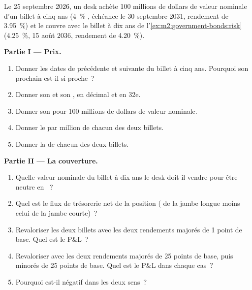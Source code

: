 \begin{problem}\label{pb:m2:government-bonds:1}
Le 25 septembre 2026, un desk achète 100 millions de dollars de valeur nominale d'un billet à cinq ans (4~\%
, échéance le 30 septembre 2031, rendement de 3.95~\%) et le couvre avec le billet à dix ans
de l'\cref{ex:m2:government-bonds:risk} (4.25~\%, 15 août 2036, rendement de
4.20~\%).

\medskip\noindent\textbf{Partie I --- Prix.}
\begin{enumerate}
\item Donner les dates de  précédente et suivante du billet à cinq ans. Pourquoi son
prochain  est-il si proche~?
\item Donner son  et son , en décimal et en 32e.
\item Donner son  pour 100 millions de dollars de valeur nominale.
\item Donner le  par million de chacun des deux billets.
\item Donner la  de chacun des deux billets.
\end{enumerate}

\medskip\noindent\textbf{Partie II --- La couverture.}
\begin{enumerate}[resume]
\item Quelle valeur nominale du billet à dix ans le desk doit-il vendre pour être neutre en ~?
\item Quel est le flux de trésorerie net de la position ( de la jambe longue moins
celui de la jambe courte)~?
\item Revaloriser les deux billets avec les deux rendements majorés de 1 point de base. Quel
est le P\&L~?
\item Revaloriser avec les deux rendements majorés de 25 points de base, puis minorés de 25 points de base. Quel
est le P\&L dans chaque cas~?
\item Pourquoi est-il négatif dans les deux sens~?
\end{enumerate}


\end{problem}

